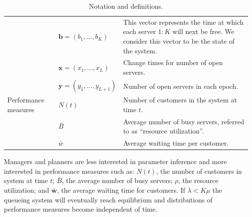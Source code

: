 \documentclass[article]{jss}
\begin{document}
\begin{table}
\begin{tabular}{llp{14cm}}
& $\mathbf{b} = (b_1, \ldots, b_K )$ & This vector represents the time at which each server $1:K$ will next be free. We consider this vector to be the state of the system. \\ 

& $\mathbf{x} = (x_1, \ldots, x_L )$ & Change times for number of open servers. \\ 

& $\mathbf{y} = (y_1, \ldots, y_{L+1} )$ & Number of open servers in each epoch. \\



\hline

Performance measures

& $N(t)$ & Number of customers in the system at time $t$. \\
& $\bar{B}$ & Average number of busy servers, referred to as ``resource utilization''. \\
& $\bar{w}$ & Average waiting time per customer. \\

\hline
\end{tabular}
\caption{Notation and definitions.}\label{tab:notation}
\end{table}

Managers and planners are less interested in parameter inference and
more interested in performance measures such as: $N(t)$, the number of
customers in system at time $t$; $\bar{B}$, the average number of busy
servers; $\rho$, the resource utilization; and $\bar{\mathbf{w}}$, the
average waiting time for customers. If $\lambda < K \mu$ the queueing
system will eventually reach equilibrium and distributions of
performance measures become independent of time.
\end{document}
